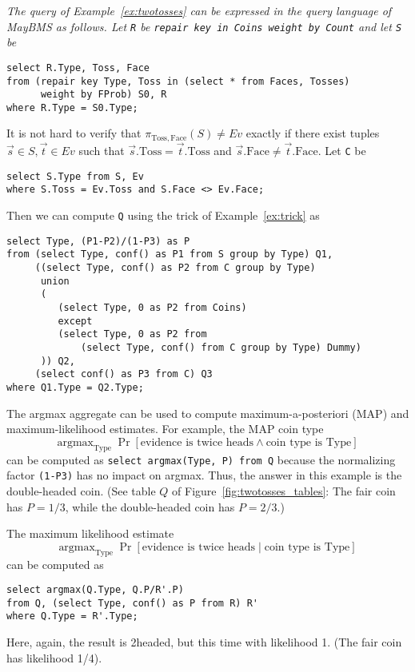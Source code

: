 \begin{example}\em
\label{ex:coins_sql}
The query of Example~\ref{ex:twotosses} can be expressed in the query language of MayBMS as follows.
Let {\tt R} be {\tt repair key in Coins weight by Count} and let {\tt S} be
\begin{verbatim}
select R.Type, Toss, Face
from (repair key Type, Toss in (select * from Faces, Tosses)
      weight by FProb) S0, R
where R.Type = S0.Type;
\end{verbatim}

It is not hard to verify that $\pi_{\mathrm{Toss}, \mathrm{Face}}(S) \neq Ev$
exactly if there exist tuples $\vec{s} \in S, \vec{t} \in Ev$ such that
$\vec{s}.\mathrm{Toss}=\vec{t}.\mathrm{Toss}$ and
$\vec{s}.\mathrm{Face} \neq \vec{t}.\mathrm{Face}$.
Let {\tt C} be
\begin{verbatim}
select S.Type from S, Ev
where S.Toss = Ev.Toss and S.Face <> Ev.Face;
\end{verbatim}

Then we can compute {\tt Q} using the trick of Example~\ref{ex:trick} as
\begin{verbatim}
select Type, (P1-P2)/(1-P3) as P
from (select Type, conf() as P1 from S group by Type) Q1,
     ((select Type, conf() as P2 from C group by Type)
      union
      (
         (select Type, 0 as P2 from Coins)
         except
         (select Type, 0 as P2 from
             (select Type, conf() from C group by Type) Dummy)
      )) Q2,
     (select conf() as P3 from C) Q3
where Q1.Type = Q2.Type;
\end{verbatim}

The argmax aggregate can be used to compute maximum-a-posteriori (MAP) and maximum-likelihood estimates.
For example,
the MAP coin type
\[
\mbox{argmax}_{\mathrm{Type}} \; \Pr[\mbox{evidence is twice heads} \land \mbox{coin type is Type}]
\]
can be computed as
{\tt select argmax(Type, P) from Q}
because the normalizing factor {\tt (1-P3)} has no impact on argmax. Thus, the answer in this example
is the double-headed coin. (See table $Q$ of Figure~\ref{fig:twotosses_tables}: The fair coin has $P=1/3$, while the double-headed coin has $P=2/3$.)

The maximum likelihood estimate
\[
\mbox{argmax}_{\mathrm{Type}} \; \Pr[\mbox{evidence is twice heads} \mid \mbox{coin type is Type}]
\]
can be computed as
\begin{verbatim}
select argmax(Q.Type, Q.P/R'.P) 
from Q, (select Type, conf() as P from R) R'
where Q.Type = R'.Type;
\end{verbatim}
Here, again, the result is 2headed, but this time with likelihood
1. (The fair coin has likelihood 1/4).
%
\punto
\end{example}


